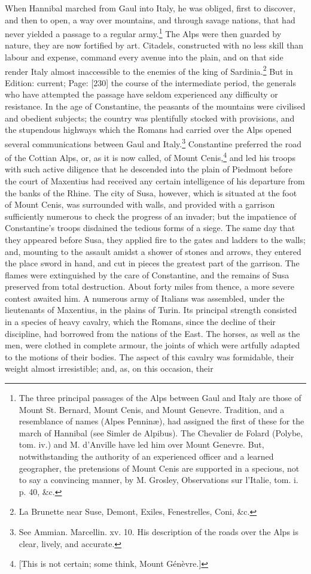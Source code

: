 When Hannibal marched from Gaul into Italy, he was obliged, first to discover, and then to open, a way over mountains, and through savage nations, that had never yielded a passage to a regular army.\footnote{The three principal passages of the Alps between Gaul and Italy are those of Mount St. Bernard, Mount Cenis, and Mount Genevre. Tradition, and a resemblance of names (Alpes Penninæ), had assigned the first of these for the march of Hannibal (see Simler de Alpibus). The Chevalier de Folard (Polybe, tom. iv.) and M. d\texthebrew{}’Anville have led him over Mount Genevre. But, notwithstanding the authority of an experienced officer and a learned geographer, the pretensions of Mount Cenis are supported in a specious, not to say a convincing manner, by M. Grosley, Observations sur l\texthebrew{}’Italie, tom. i. p. 40, \&c.} The Alps were then guarded by nature, they are now fortified by art. Citadels, constructed with no less skill than labour and expense, command every avenue into the plain, and on that side render Italy almost inaccessible to the enemies of the king of Sardinia.\footnote{La Brunette near Suse, Demont, Exiles, Fenestrelles, Coni, \&c.} But in Edition: current; Page: [230] the course of the intermediate period, the generals who have attempted the passage have seldom experienced any difficulty or resistance. In the age of Constantine, the peasants of the mountains were civilised and obedient subjects; the country was plentifully stocked with provisions, and the stupendous highways which the Romans had carried over the Alps opened several communications between Gaul and Italy.\footnote{See Ammian. Marcellin. xv. 10. His description of the roads over the Alps is clear, lively, and accurate.} Constantine preferred the road of the Cottian Alps, or, as it is now called, of Mount Cenis,\footnote{[This is not certain; some think, Mount Génèvre.]} and led his troops with such active diligence that he descended into the plain of Piedmont before the court of Maxentius had received any certain intelligence of his departure from the banks of the Rhine. The city of Susa, however, which is situated at the foot of Mount Cenis, was surrounded with walls, and provided with a garrison sufficiently numerous to check the progress of an invader; but the impatience of Constantine\texthebrew{}’s troops disdained the tedious forms of a siege. The same day that they appeared before Susa, they applied fire to the gates and ladders to the walls; and, mounting to the assault amidst a shower of stones and arrows, they entered the place sword in hand, and cut in pieces the greatest part of the garrison. The flames were extinguished by the care of Constantine, and the remains of Susa preserved from total destruction. About forty miles from thence, a more severe contest awaited him. A numerous army of Italians was assembled, under the lieutenants of Maxentius, in the plains of Turin. Its principal strength consisted in a species of heavy cavalry, which the Romans, since the decline of their discipline, had borrowed from the nations of the East. The horses, as well as the men, were clothed in complete armour, the joints of which were artfully adapted to the motions of their bodies. The aspect of this cavalry was formidable, their weight almost irresistible; and, as, on this occasion, their 
